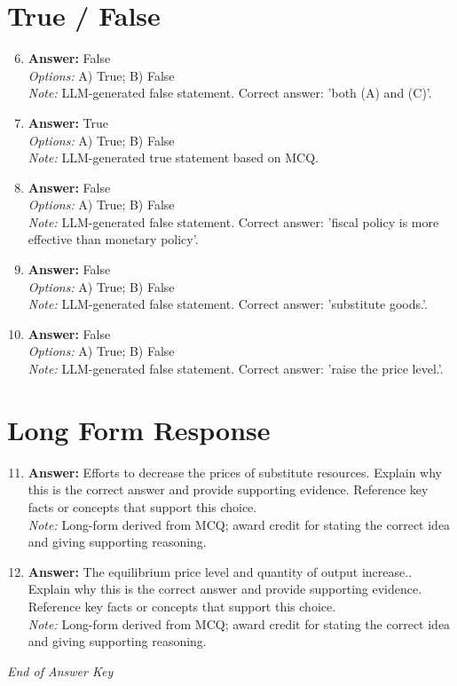 \documentclass[12pt]{article}
\begin{document}
\section*{True / False}
\begin{enumerate}[label=\arabic*.]
\setcounter{enumi}{5}
\item \textbf{Answer:} False
\\ \textit{Options:} A) True; B) False
\\ \textit{Note:} LLM-generated false statement. Correct answer: 'both (A) and (C)'.
\item \textbf{Answer:} True
\\ \textit{Options:} A) True; B) False
\\ \textit{Note:} LLM-generated true statement based on MCQ.
\item \textbf{Answer:} False
\\ \textit{Options:} A) True; B) False
\\ \textit{Note:} LLM-generated false statement. Correct answer: 'fiscal policy is more effective than monetary policy'.
\item \textbf{Answer:} False
\\ \textit{Options:} A) True; B) False
\\ \textit{Note:} LLM-generated false statement. Correct answer: 'substitute goods.'.
\item \textbf{Answer:} False
\\ \textit{Options:} A) True; B) False
\\ \textit{Note:} LLM-generated false statement. Correct answer: 'raise the price level.'.
\end{enumerate}

\section*{Long Form Response}
\begin{enumerate}[label=\arabic*.]
\setcounter{enumi}{10}
\item \textbf{Answer:} Efforts to decrease the prices of substitute resources. Explain why this is the correct answer and provide supporting evidence. Reference key facts or concepts that support this choice.
\\ \textit{Note:} Long-form derived from MCQ; award credit for stating the correct idea and giving supporting reasoning.
\item \textbf{Answer:} The equilibrium price level and quantity of output increase.. Explain why this is the correct answer and provide supporting evidence. Reference key facts or concepts that support this choice.
\\ \textit{Note:} Long-form derived from MCQ; award credit for stating the correct idea and giving supporting reasoning.
\end{enumerate}

\vfill
\noindent\textit{End of Answer Key}
\end{document}
